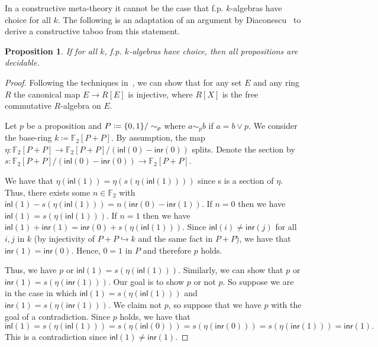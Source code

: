 \documentclass[10pt,a4paper]{article}
\newtheorem{proposition}[theorem]{Proposition}
\theoremstyle{definition}
\theoremstyle{remark}
\newcommand\inl{\mathsf{inl}}
\newcommand\inr{\mathsf{inr}}
\DeclarePairedDelimiter\set{\{}{\}}
\begin{document}

In a constructive meta-theory it cannot be the case that f.p. \(k\)-algebras have choice for all \(k\).
The following is an adaptation of an argument by Diaconescu~\cite{diaconescu1975choice} to derive a constructive taboo from this statement.

\begin{proposition}
  If for all \(k\), f.p. \(k\)-algebras have choice, then all propositions are decidable.
\end{proposition}
\begin{proof}
  Following the techniques in~\cite{mines}, we can show that for any set \(E\) and any ring \(R\) the canonical map \(E \to R[E]\) is injective, where \(R[X]\) is the free commutative \(R\)-algebra on \(E\).

  Let \(p\) be a proposition and \(P \coloneqq \set{0,1} / \sim_p\) where \(a \sim_p b\) if \(a = b \vee p\).
  We consider the base-ring \(k \coloneqq \mathbb{F}_2[P + P]\).
  By assumption, the map \(\eta \colon \mathbb{F}_2[P + P] \to \mathbb{F}_2[P + P] / (\inl(0) - \inr(0))\) splits.
  Denote the section by \(s : \mathbb{F}_2[P + P] / (\inl(0) - \inr(0)) \to \mathbb{F}_2[P + P]\).

  We have that \(\eta(\inl(1)) = \eta(s(\eta(\inl(1))))\) since s is a section of \(\eta\).
  Thus, there exists some \(n \in \mathbb{F}_2\) with \(\inl(1) - s(\eta(\inl(1))) = n(\inr(0) - \inr(1))\).
  If \(n = 0\) then we have \(\inl(1) = s(\eta(\inl(1)))\).
  If \(n = 1\) then we have \(\inl(1) + \inr(1) = \inr(0) + s(\eta(\inl(1)))\).
  Since \(\inl(i) \ne \inr(j)\) for all \(i, j\) in \(k\) (by injectivity of \(P + P \hookrightarrow k\) and the same fact in \(P + P\)), we have that \(\inr(1) = \inr(0)\).
  Hence, \(0 = 1\) in \(P\) and therefore \(p\) holds.

  Thus, we have \(p\) or \(\inl(1) = s(\eta(\inl(1)))\).
  Similarly, we can show that \(p\) or \(\inr(1) = s(\eta(\inr(1)))\).
  Our goal is to show \(p\) or not \(p\).
  So suppose we are in the case in which \(\inl(1) = s(\eta(\inl(1)))\) and \(\inr(1) = s(\eta(\inr(1)))\).
  We claim not \(p\), so suppose that we have \(p\) with the goal of a contradiction.
  Since \(p\) holds, we have that
  \[
    \inl(1) = s(\eta(\inl(1))) = s(\eta(\inl(0))) = s(\eta(\inr(0))) = s(\eta(\inr(1))) = \inr(1).
  \]
  This is a contradiction since \(\inl(1) \ne \inr(1)\).
\end{proof}
\end{document}
